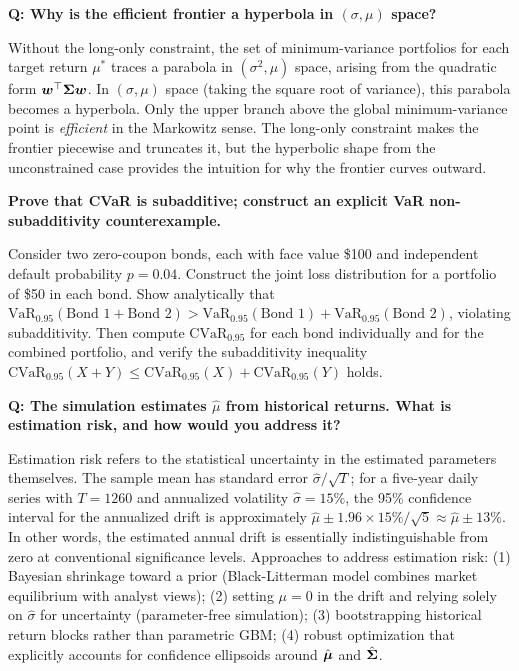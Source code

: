 \begin{interviewbox}
  \textbf{Q: Why is the efficient frontier a hyperbola in $(\sigma, \mu)$ space?}

  Without the long-only constraint, the set of minimum-variance portfolios for each target return $\mu^*$ traces a parabola in $(\sigma^2, \mu)$ space, arising from the quadratic form $\boldsymbol{w}^{\top}\mathbf{\Sigma}\boldsymbol{w}$. In $(\sigma, \mu)$ space (taking the square root of variance), this parabola becomes a hyperbola. Only the upper branch above the global minimum-variance point is \emph{efficient} in the Markowitz sense. The long-only constraint makes the frontier piecewise and truncates it, but the hyperbolic shape from the unconstrained case provides the intuition for why the frontier curves outward.
\end{interviewbox}

\begin{challengebox}
  \textbf{Prove that CVaR is subadditive; construct an explicit VaR non-subadditivity counterexample.}

  Consider two zero-coupon bonds, each with face value \$100 and independent default probability $p = 0.04$. Construct the joint loss distribution for a portfolio of \$50 in each bond. Show analytically that $\text{VaR}_{0.95}(\text{Bond 1} + \text{Bond 2}) > \text{VaR}_{0.95}(\text{Bond 1}) + \text{VaR}_{0.95}(\text{Bond 2})$, violating subadditivity. Then compute $\text{CVaR}_{0.95}$ for each bond individually and for the combined portfolio, and verify the subadditivity inequality $\text{CVaR}_{0.95}(X+Y) \leq \text{CVaR}_{0.95}(X) + \text{CVaR}_{0.95}(Y)$ holds.
\end{challengebox}

\begin{interviewbox}
  \textbf{Q: The simulation estimates $\hat{\mu}$ from historical returns. What is estimation risk, and how would you address it?}

  Estimation risk refers to the statistical uncertainty in the estimated parameters themselves. The sample mean has standard error $\hat{\sigma}/\sqrt{T}$; for a five-year daily series with $T = 1260$ and annualized volatility $\hat{\sigma} = 15\%$, the 95\% confidence interval for the annualized drift is approximately $\hat{\mu} \pm 1.96 \times 15\%/\sqrt{5} \approx \hat{\mu} \pm 13\%$. In other words, the estimated annual drift is essentially indistinguishable from zero at conventional significance levels. Approaches to address estimation risk: (1) Bayesian shrinkage toward a prior (Black-Litterman model combines market equilibrium with analyst views); (2) setting $\mu = 0$ in the drift and relying solely on $\hat{\sigma}$ for uncertainty (parameter-free simulation); (3) bootstrapping historical return blocks rather than parametric GBM; (4) robust optimization that explicitly accounts for confidence ellipsoids around $\hat{\boldsymbol{\mu}}$ and $\hat{\mathbf{\Sigma}}$.
\end{interviewbox}
